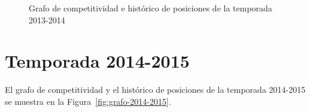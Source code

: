 \begin{figure}[htbp]
\centering
{}
\caption[Competitividad de la temporada 2013-2014]{Grafo de competitividad e histórico de posiciones de la temporada 2013-2014} \label{fig:grafo-2013-2014}
\end{figure}

\clearpage

\section{Temporada 2014-2015}

El grafo de competitividad y el histórico de posiciones de la temporada 2014-2015 se muestra en la Figura~\ref{fig:grafo-2014-2015}.

